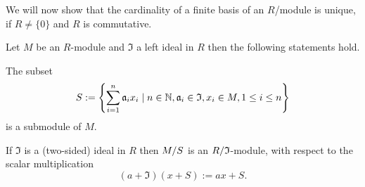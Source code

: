 We will now show that the cardinality of a finite basis of an $R$\-/module is unique, if $R\neq\lbrace 0\rbrace$ and $R$ is commutative.

\begin{lem}\label{lm.SigmaModule}
Let $M$ be an $R$-module and $\mathfrak{I}$ a left ideal in $R$ then the following statements hold.
\begin{thmlist}
\item The subset \label{lm.Sigma}
\begin{equation*}
S:=\left\lbrace\sum_{i=1}^n \mathfrak{a}_ix_i\mid n\in\N, \mathfrak{a}_i\in \mathfrak{I}, x_i\in M, 1\leq i\leq n\right\rbrace
\end{equation*}
is a submodule of $M$.
\item If $\mathfrak{I}$ is a (two-sided) ideal in $R$ then $\nicefrac{M}{S}$ is an $\nicefrac{R}{\mathfrak{I}}$-module, with respect to the scalar multiplication
\begin{equation*}
(a+\mathfrak{I})(x+S):=ax+S.
\end{equation*}
\end{thmlist}
\end{lem}
